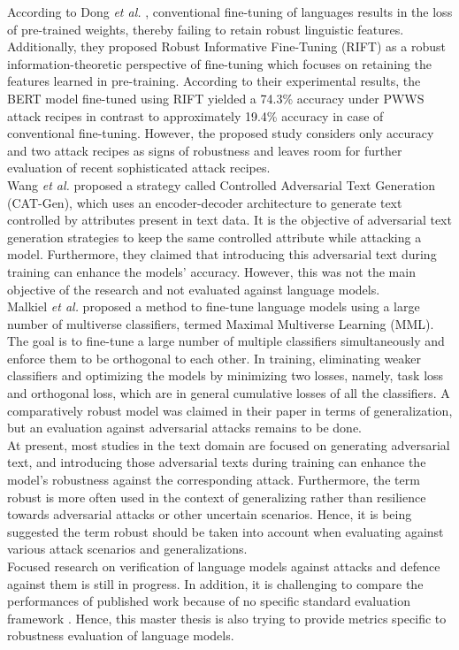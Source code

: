 \documentclass[%
	BCOR=8mm, %
	DIV=12,
	toc=bibliography, %
	toc=listof, %
	oneside, %
	egregdoesnotlikesansseriftitles, %
	]{scrbook}
\begin{document}
According to Dong \textit{et al.} \cite{dong_how_2021}, conventional fine-tuning of languages results in the loss of pre-trained weights, thereby failing to retain robust linguistic features. Additionally, they proposed Robust Informative Fine-Tuning (RIFT) as a robust information-theoretic perspective of fine-tuning which focuses on retaining the features learned in pre-training. According to their experimental results, the BERT model fine-tuned using RIFT yielded a 74.3\% accuracy under PWWS attack recipes in contrast to  approximately 19.4\% accuracy in case of conventional fine-tuning. However, the proposed study considers only accuracy and two attack recipes as signs of robustness and leaves room for further evaluation of recent sophisticated attack recipes.\\
Wang \textit{et al.} \cite{wang_cat-gen_2020} proposed a strategy called Controlled Adversarial Text Generation (CAT-Gen), which uses an encoder-decoder architecture to generate text controlled by attributes present in text data. It is the objective of adversarial text generation strategies to keep the same controlled attribute while attacking a model. Furthermore, they claimed that introducing this adversarial text during training can enhance the models' accuracy. However, this was not the main objective of the research and not evaluated against language models.\\
 Malkiel \textit{et al.} \cite{malkiel_mml_2019} proposed a method to fine-tune language models using a large number of multiverse classifiers, termed Maximal Multiverse Learning (MML). The goal is to fine-tune a large number of multiple classifiers simultaneously and enforce them to be orthogonal to each other. In training, eliminating weaker classifiers and optimizing the models by minimizing two losses, namely, task loss and orthogonal loss, which are in general cumulative losses of all the classifiers. A comparatively robust model was claimed in their paper in terms of generalization, but an evaluation against adversarial attacks remains to be done.\\
At present, most studies in the text domain are focused on generating adversarial text, and introducing those adversarial texts during training can enhance the model's robustness against the corresponding attack.  Furthermore, the term robust is more often used in the context of generalizing rather than resilience towards adversarial attacks or other uncertain scenarios. Hence, it is being suggested the term robust should be taken into account when evaluating against various attack scenarios and generalizations. \\
Focused research on verification of language models against attacks and defence against them is still in progress. In addition, it is challenging to compare the performances of published work because of no specific standard evaluation framework \cite{moradi_evaluating_2021-1}. Hence, this master thesis is also trying to provide metrics specific to robustness evaluation of language models.
\end{document}
